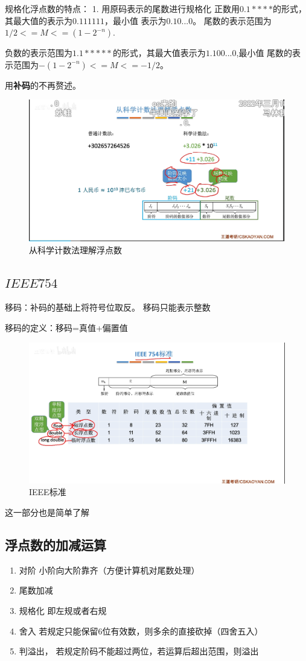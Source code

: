 \documentclass[12pt]{ctexart}
\begin{document}
规格化浮点数的特点：
1. 用原码表示的尾数进行规格化
正数用$0.1 * ***$的形式，其最大值的表示为$0.111111$，最小值
表示为$0.10...0$。
尾数的表示范围为$1/2<=M<=(1-2^{-n})$.

负数的表示范围为$1.1*****$的形式，其最大值表示为$1.100...0$,最小值
尾数的表示范围为$-(1-2^{-n})<=M<=-1/2$。

用\textbf{补码}的不再赘述。
\begin{figure}[htbp]
    \centering
    \includegraphics[scale=0.6]{从科学计数法理解浮点数.png}
    \caption{从科学计数法理解浮点数}
    \end{figure}
\subsection{$IEEE 754$}
移码：补码的基础上将符号位取反。
移码只能表示整数

移码的定义：移码=真值+偏置值
\begin{figure}[htbp]
    \centering
    \includegraphics[scale=0.6]{IEEE.png}
    \caption{IEEE标准}
    \end{figure}
这一部分也是简单了解

\subsection{浮点数的加减运算}
\begin{enumerate}
    \item 对阶 小阶向大阶靠齐（方便计算机对尾数处理）
    \item 尾数加减
    \item 规格化 即左规或者右规
    \item 舍入 若规定只能保留6位有效数，则多余的直接砍掉（四舍五入）
    \item 判溢出， 若规定阶码不能超过两位，若运算后超出范围，则溢出
\end{enumerate}
\end{document}
